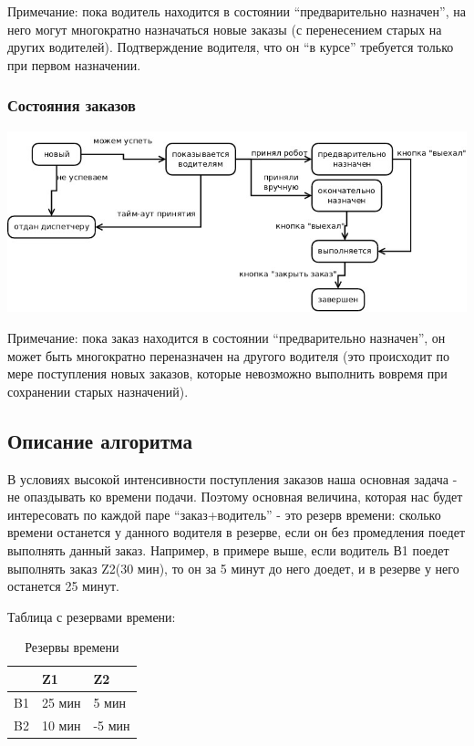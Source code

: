 			Примечание: пока водитель находится в состоянии “предварительно назначен”, на него могут многократно назначаться новые заказы (с перенесением старых на других водителей). Подтверждение водителя, что он “в курсе” требуется только при первом назначении.

		\subsubsection{Состояния заказов}

			\includegraphics[width=\textwidth]{images/appendices/orders_state}

			Примечание: пока заказ находится в состоянии “предварительно назначен”, он может быть многократно переназначен на другого водителя (это происходит по мере поступления новых заказов, которые невозможно выполнить вовремя при сохранении старых назначений).

	\subsection{Описание алгоритма}

		В условиях высокой интенсивности поступления заказов наша основная задача - не опаздывать ко времени подачи.  Поэтому основная величина, которая нас будет интересовать по каждой паре “заказ+водитель” - это резерв времени: сколько времени останется у данного водителя в резерве, если он без промедления поедет выполнять данный заказ. Например, в примере выше, если водитель В1 поедет выполнять заказ Z2(30 мин), то он за 5 минут до него доедет, и в резерве у него останется 25 минут.

		Таблица с резервами времени:

		\begin{table}[htb]
	        \begin{center}
	        \caption{Резервы времени}
	        \label{appendices_algorithm_expl}
	        \setlength{\extrarowheight}{2mm}
	        \begin{tabular}{|p{2cm}|p{2cm}|p{2cm}|}
	           \hline   \textbf{ }&\textbf{Z1}&\textbf{Z2} \\ [2mm]

	           \hline B1 & 25 мин & 5 мин\\ [2mm]

	           \hline B2 & 10 мин & -5 мин\\ [2mm]    

	           \hline
	        \end{tabular}
	        \end{center}
      	\end{table}

